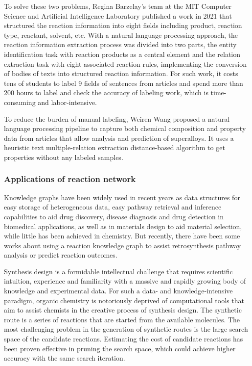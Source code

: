 \documentclass[%
 aip,
 jmp,%
 amsmath,amssymb,
 reprint,%
]{revtex4-2}
\begin{document}
To solve these two problems, Regina Barzelay's team at the MIT Computer Science and Artificial Intelligence Laboratory published a work in 2021 that structured the reaction information into eight fields including product, reaction type, reactant, solvent, etc. With a natural language processing approach, the reaction information extraction process was divided into two parts, the entity identification task with reaction products as a central element and the relation extraction task with eight associated reaction rules, implementing the conversion of bodies of texts into structured reaction information\cite{guo2021automated}. For such work, it costs tens of students to label 9 fields of sentences from articles and spend more than 200 hours to label and check the accuracy of labeling work, which is time-consuming and labor-intensive.

To reduce the burden of manual labeling, Weiren Wang proposed a natural language processing pipeline to capture both chemical composition and property data from articles that allow analysis and prediction of superalloys. It uses a heuristic text multiple-relation extraction distance-based algorithm to get properties without any labeled samples\cite{wang2022automated}.

\subsubsection{Applications of reaction network}
Knowledge graphs have been widely used in recent years as data structures for easy storage of heterogeneous data, easy pathway retrieval and inference capabilities to aid drug discovery\cite{zeng2022toward}, disease diagnosis\cite{chai2020diagnosis} and drug detection in biomedical applications\cite{wang2021drug}, as well as in materials design to aid material selection\cite{nie2022automating}, while little has been achieved in chemistry. But recently, there have been some works about using a reaction knowledge graph to assist retrosynthesis pathway analysis\cite{jeong2022intelligent} or predict reaction outcomes\cite{nair2019data}.

Synthesis design\cite{dorwald2006side} is a formidable intellectual challenge that requires scientific intuition, experience and familiarity with a massive and rapidly growing body of knowledge and experimental data. For such a data- and knowledge-intensive paradigm, organic chemistry is notoriously deprived of computational tools that aim to assist chemists in the creative process of synthesis design. The synthetic route is a series of reactions that are started from the available molecules. The most challenging problem in the generation of synthetic routes is the large search space of the candidate reactions. 
Estimating the cost of candidate reactions has been proven effective in pruning the search space, which could achieve higher accuracy with the same search iteration.
\end{document}
